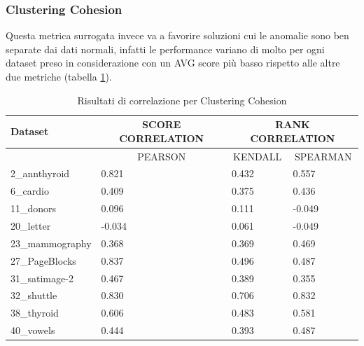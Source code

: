 \newpage
\subsubsection{Clustering Cohesion}
Questa metrica surrogata invece va a favorire soluzioni cui le anomalie sono ben separate dai dati normali, infatti le performance variano di molto per ogni dataset preso in considerazione con un AVG score più basso rispetto alle altre due metriche (tabella \ref{cc-results}).


\begin{table}[]
	\caption{\label{cc-results}Risultati di correlazione per Clustering Cohesion}
		\begin{tabular}{|l|l|l|l|}
			\hline
			Dataset         & \multicolumn{1}{c|}{SCORE CORRELATION} & \multicolumn{2}{c|}{RANK CORRELATION}                         \\  \hline
			                & \multicolumn{1}{c|}{PEARSON} & \multicolumn{1}{c|}{KENDALL} & \multicolumn{1}{c|}{SPEARMAN} \\ \hline
			2\_annthyroid   & 0.821                        & 0.432                        & 0.557                         \\ \hline
			6\_cardio       & 0.409                        & 0.375                        & 0.436                         \\ \hline
			11\_donors      & 0.096                        & 0.111                        & -0.049                        \\ \hline
			20\_letter      & -0.034                       & 0.061                        & -0.049                        \\ \hline
			23\_mammography & 0.368                        & 0.369                        & 0.469                         \\ \hline
			27\_PageBlocks  & 0.837                        & 0.496                        & 0.487                         \\ \hline
			31\_satimage-2  & 0.467                        & 0.389                        & 0.355                         \\ \hline
			32\_shuttle     & 0.830                        & 0.706                        & 0.832                         \\ \hline
			38\_thyroid     & 0.606                        & 0.483                        & 0.581                         \\ \hline
			40\_vowels      & 0.444                        & 0.393                        & 0.487                         \\ \hline

\end{tabular}
\end{table}
